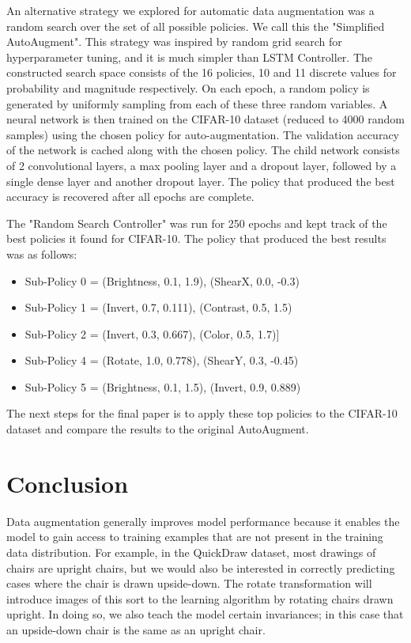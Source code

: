 \documentclass[10pt,twocolumn,letterpaper]{article}
\begin{document}
An alternative strategy we explored for automatic data augmentation was a random search over the set of all possible policies. We call this the "Simplified AutoAugment".  This strategy was inspired by random grid search for hyperparameter tuning, and it is much simpler than LSTM Controller. The constructed search space consists of the 16 policies, 10 and 11 discrete values for probability and magnitude respectively. On each epoch, a random policy is generated by uniformly sampling from each of these three random variables. A neural network is then trained on the CIFAR-10 dataset (reduced to 4000 random samples) using the chosen policy for auto-augmentation. The validation accuracy of the network is cached along with the chosen policy. The child network consists of 2 convolutional layers, a max pooling layer and a dropout layer, followed by a single dense layer and another dropout layer. The policy that produced the best accuracy is recovered after all epochs are complete.

The "Random Search Controller" was run for 250 epochs and kept track of the best policies it found for CIFAR-10. The policy that produced the best results was as follows:

\begin{itemize}
  \item Sub-Policy 0 = (Brightness, 0.1, 1.9), (ShearX, 0.0, -0.3)
  \item Sub-Policy 1 = (Invert, 0.7, 0.111), (Contrast, 0.5, 1.5)
  \item Sub-Policy 2 = (Invert, 0.3, 0.667), (Color, 0.5, 1.7)]
  \item Sub-Policy 4 = (Rotate, 1.0, 0.778), (ShearY, 0.3, -0.45)
  \item Sub-Policy 5 = (Brightness, 0.1, 1.5), (Invert, 0.9, 0.889)
 
\end{itemize}

The next steps for the final paper is to apply these top policies to the CIFAR-10 dataset and compare the results to the original AutoAugment.



\section{Conclusion}

Data augmentation generally improves model performance because it enables the model to gain access to training examples that are not present in the training data distribution. For example, in the QuickDraw dataset, most drawings of chairs are upright chairs, but we would also be interested in correctly predicting cases where the chair is drawn upside-down. The rotate transformation will introduce images of this sort to the learning algorithm by rotating chairs drawn upright. In doing so, we also teach the model certain invariances; in this case that an upside-down chair is the same as an upright chair.
\end{document}
